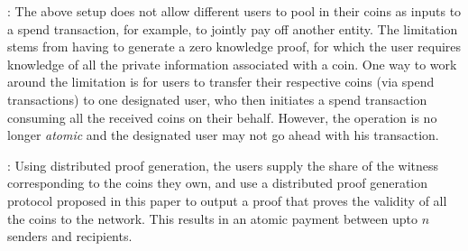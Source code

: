 : The above setup does not allow different users to pool in their coins as inputs to a spend transaction, for example,
to jointly pay off another entity. The limitation stems from having to generate a zero knowledge proof, for which the user requires knowledge of all the
private information associated with a coin. One way to work around the limitation is for users to transfer their respective coins (via spend transactions) 
to one designated user, who then initiates a spend transaction consuming all the received coins on their behalf. 
However, the operation is no longer {\em atomic} and the designated user may not go ahead with his transaction. 

: Using distributed proof generation, the users supply the share of the witness corresponding to the coins they own,
and use a distributed proof generation protocol proposed in this paper to output a proof that proves the validity of all the coins to the network. This
results in an atomic payment between upto $n$ senders and recipients. 